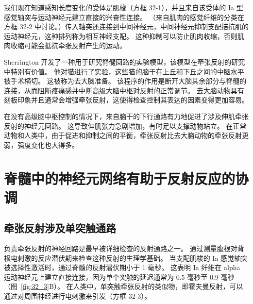 我们现在知道感知长度变化的受体是肌梭（方框 32-1），并且来自该受体的 Ia 型感觉轴突与运动神经元建立直接的兴奋性连接。
（来自肌肉的感觉纤维的分类在方框 32-2 中讨论。）传入轴突还连接到中间神经元，中间神经元抑制支配拮抗肌的运动神经元，这种排列称为相互神经支配。
这种抑制可以防止肌肉收缩，否则肌肉收缩可能会抵抗牵张反射产生的运动。


Sherrington 开发了一种用于研究脊髓回路的实验模型，该模型在牵张反射的研究中特别有价值。
他对猫进行了实验，这些猫的脑干在上丘和下丘之间的中脑水平被手术横切。
这被称为去大脑准备。
该程序的作用是断开大脑其余部分与脊髓的连接，从而阻断疼痛感并中断高级大脑中枢对反射的正常调节。
去大脑动物具有刻板印象并且通常会增强牵张反射，这使得检查控制其表达的因素变得更加容易。


在没有高级脑中枢控制的情况下，来自脑干的下行通路有力地促进了涉及伸肌牵张反射的神经元回路。
这导致伸肌张力急剧增加，有时足以支撑动物站立。
在正常动物和人类中，由于促进和抑制之间的平衡，牵张反射比去大脑动物的牵张反射更弱，强度变化也大得多。



\section{脊髓中的神经元网络有助于反射反应的协调}

\subsection{牵张反射涉及单突触通路}

负责牵张反射的神经回路是最早被详细检查的反射通路之一。
通过测量腹根对背根电刺激的反应潜伏期来检查这种反射的生理学基础。
当支配肌梭的 Ia 感觉轴突被选择性激活时，通过脊髓的反射潜伏期小于 1 毫秒。
这表明 Ia 纤维在 alpha 运动神经元上建立直接连接，因为单个突触的延迟通常为 0.5 毫秒至 0.9 毫秒（图~\ref{fig:32_3}B）。
在人类中，单突触牵张反射的类似物，即霍夫曼反射，可以通过对周围神经进行电刺激来引发（方框 32-3）。


